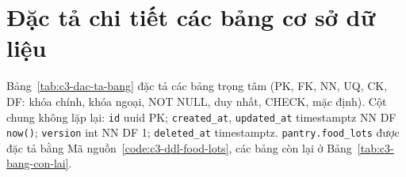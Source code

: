 \section{Đặc tả chi tiết các bảng cơ sở dữ liệu}\label{pl:dac-ta-bang}

Bảng~\ref{tab:c3-dac-ta-bang} đặc tả các bảng trọng tâm (PK, FK, NN, UQ, CK, DF: khóa chính, khóa ngoại, NOT NULL, duy nhất, CHECK, mặc định). Cột chung không lặp lại: \texttt{id} uuid PK; \texttt{created\_at}, \texttt{updated\_at} timestamptz NN DF \texttt{now()}; \texttt{version} int NN DF 1; \texttt{deleted\_at} timestamptz. \texttt{pantry.food\_lots} được đặc tả bằng Mã nguồn~\ref{code:c3-ddl-food-lots}, các bảng còn lại ở Bảng~\ref{tab:c3-bang-con-lai}.


